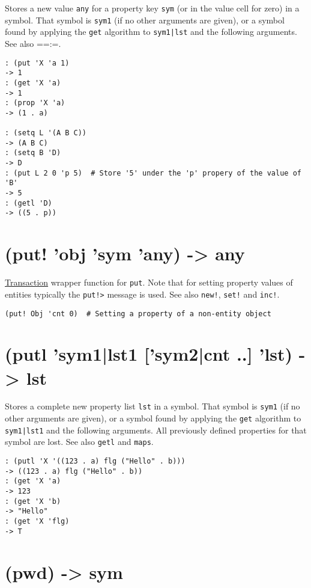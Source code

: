 {{{{{{{{Stores a new value \texttt{any} for a property key \texttt{sym} (or in the value cell
for zero) in a symbol. That symbol is \texttt{sym1} (if no other arguments are
given), or a symbol found by applying the \texttt{get} algorithm to \texttt{sym1|lst}
and the following arguments. See also ==:=.


\begin{verbatim}
: (put 'X 'a 1)
-> 1
: (get 'X 'a)
-> 1
: (prop 'X 'a)
-> (1 . a)

: (setq L '(A B C))
-> (A B C)
: (setq B 'D)
-> D
: (put L 2 0 'p 5)  # Store '5' under the 'p' propery of the value of 'B'
-> 5
: (getl 'D)
-> ((5 . p))
\end{verbatim}

 
\section{(put! 'obj 'sym 'any) -> any}
\label{sec-8-1-16-46}


\hyperref[ref.html-trans]{Transaction} wrapper function for \texttt{put}. Note that
for setting property values of entities typically the \texttt{put!>} message is
used. See also \texttt{new!}, \texttt{set!} and \texttt{inc!}.


\begin{verbatim}
(put! Obj 'cnt 0)  # Setting a property of a non-entity object
\end{verbatim}

 
\section{(putl 'sym1|lst1 ['sym2|cnt ..] 'lst) -> lst}
\label{sec-8-1-16-47}


Stores a complete new property list \texttt{lst} in a symbol. That symbol is
\texttt{sym1} (if no other arguments are given), or a symbol found by applying
the \texttt{get} algorithm to \texttt{sym1|lst1} and the following arguments. All
previously defined properties for that symbol are lost. See also \texttt{getl}
and \texttt{maps}.


\begin{verbatim}
: (putl 'X '((123 . a) flg ("Hello" . b)))
-> ((123 . a) flg ("Hello" . b))
: (get 'X 'a)
-> 123
: (get 'X 'b)
-> "Hello"
: (get 'X 'flg)
-> T
\end{verbatim}

 
\section{(pwd) -> sym}
\label{sec-8-1-16-48}


}}}}}}}}
